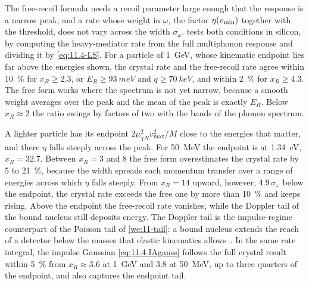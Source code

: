 The free-recoil formula needs a recoil parameter large enough that the response is a narrow peak, and a rate whose weight in $\omega$, the factor $\eta(v_{\mathrm{min}})$ together with the threshold, does not vary across the width $\sigma_\omega$.  tests both conditions in silicon, by computing the heavy-mediator rate from the full multiphonon response and dividing it by \cref{eq:11.4-LS}. For a particle of \SI{1}{GeV}, whose kinematic endpoint lies far above the energies shown, the crystal rate and the free-recoil rate agree within \SI{10}{\percent} for $x_R \ge 2.3$, or $E_R \ge \SI{93}{meV}$ and $q \ge \SI{70}{keV}$, and within \SI{2}{\percent} for $x_R \ge 4.3$. The free form works where the spectrum is not yet narrow, because a smooth weight averages over the peak and the mean of the peak is exactly $E_R$. Below $x_R \approx 2$ the ratio swings by factors of two with the bands of the phonon spectrum.

A lighter particle has its endpoint $2\mu_{\chi N}^2v_{\mathrm{max}}^2/M$ close to the energies that matter, and there $\eta$ falls steeply across the peak. For \SI{50}{MeV} the endpoint is at \SI{1.34}{eV}, $x_R = 32.7$. Between $x_R = 3$ and 8 the free form overestimates the crystal rate by 5 to \SI{21}{\percent}, because the width spreads each momentum transfer over a range of energies across which $\eta$ falls steeply. From $x_R = 14$ upward, however, $4.9\,\sigma_\omega$ below the endpoint, the crystal rate exceeds the free one by more than \SI{10}{\percent} and keeps rising. Above the endpoint the free-recoil rate vanishes, while the Doppler tail of the bound nucleus still deposits energy. The Doppler tail is the impulse-regime counterpart of the Poisson tail of \cref{we:11-tail}: a bound nucleus extends the reach of a detector below the masses that elastic kinematics allows~\cite[text after Eq.~(4)]{kahn2021dark}. In the same rate integral, the impulse Gaussian \cref{eq:11.4-IAgauss} follows the full crystal result within \SI{5}{\percent} from $x_R \approx 3.6$ at \SI{1}{GeV} and 3.8 at \SI{50}{MeV}, up to three quarters of the endpoint, and also captures the endpoint tail.


